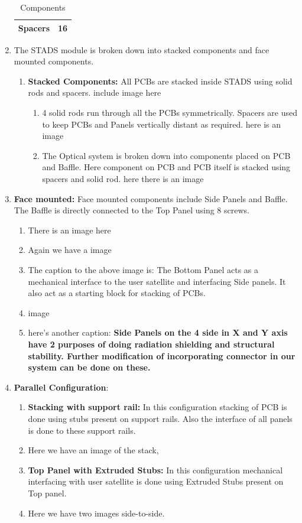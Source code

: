 \documentclass[../../main.tex]{subfiles}
\begin{document}
\begin{enumerate}
\begin{table}[h!]
\begin{tabular}{| p{5cm} | p{3cm} |}
             \hline
             Spacers & 16 \\
             \hline
        \end{tabular}
        \caption{Components}
        \label{tab:my_label}
    \end{table}
    \item The STADS module is broken down into stacked components and face mounted components.
    \begin{enumerate}
        \item \textbf{Stacked Components:} All PCBs are stacked inside STADS using solid rods and spacers.
        \text include image here %
        \begin{enumerate}
            \item 4 solid rods run through all the PCBs symmetrically. Spacers are used to keep PCBs and Panels vertically distant as required.
            \text here is an image
            \item The Optical system is broken down into components placed on PCB and Baffle. Here component on PCB and PCB itself is stacked using spacers and solid rod.
            \text here there is an image
        \end{enumerate}
    \end{enumerate}
    \item \textbf{Face mounted:} Face mounted components include Side Panels and 
    Baffle. The Baffle is directly connected to the Top Panel using 8 screws.
    \begin{enumerate}
        \item There is an image here
        \item  Again we have a image
        \item The caption  to the above image is: The Bottom Panel acts as a mechanical interface to the user satellite and interfacing Side panels. It also act as a starting block for stacking of PCBs.
        \item image
        \item here's another caption: \textbf{Side Panels on the 4 side in X and Y axis have 2 purposes of doing radiation shielding and structural stability. Further modification of incorporating connector in our system can be done on these.}
    \end{enumerate}
    \item \textbf{Parallel Configuration}:
    \begin{enumerate}
        \item \textbf{Stacking with support rail:} In this configuration stacking of PCB is done using stubs present on support rails. Also the interface of all panels is done to these support rails.
        \item Here we have an image of the stack,
        \item \textbf{Top Panel with Extruded Stubs:} In this configuration mechanical interfacing with user satellite is done using Extruded Stubs present on Top panel.
        \item Here we have two images side-to-side.
    \end{enumerate}
\end{enumerate}
\end{document}
